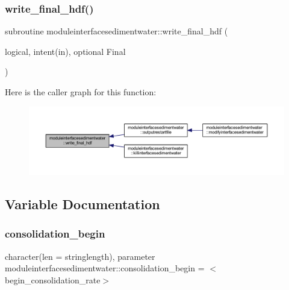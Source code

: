 \subsubsection{\texorpdfstring{write\+\_\+final\+\_\+hdf()}{write\_final\_hdf()}}
{\footnotesize\ttfamily subroutine moduleinterfacesedimentwater\+::write\+\_\+final\+\_\+hdf (\begin{DoxyParamCaption}\item[{logical, intent(in), optional}]{Final }\end{DoxyParamCaption})\hspace{0.3cm}{\ttfamily [private]}}

Here is the caller graph for this function\+:\nopagebreak
\begin{figure}[H]
\begin{center}
\leavevmode
\includegraphics[width=350pt]{namespacemoduleinterfacesedimentwater_a44d390c3a6dfc918b1ff6bc5261c39ec_icgraph}
\end{center}
\end{figure}


\subsection{Variable Documentation}
\mbox{\label{namespacemoduleinterfacesedimentwater_a1dcccf67e2359074afcdf0aa1e69f308}} 
\subsubsection{\texorpdfstring{consolidation\+\_\+begin}{consolidation\_begin}}
{\footnotesize\ttfamily character(len = stringlength), parameter moduleinterfacesedimentwater\+::consolidation\+\_\+begin = \textquotesingle{}$<$begin\+\_\+consolidation\+\_\+rate$>$\textquotesingle{}\hspace{0.3cm}{\ttfamily [private]}}

